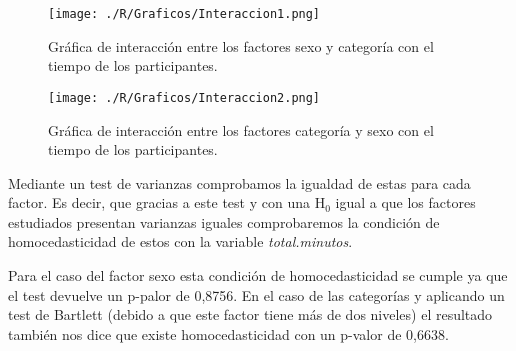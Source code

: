 \documentclass[11pt,a4paper]{article}
\begin{document}
\begin{figure}
\centering
\texttt{[image: ./R/Graficos/Interaccion1.png]}
\caption{Gráfica de interacción entre los factores sexo y categoría con el tiempo de los participantes.}
\label{fig:interaccion1}
\end{figure}

\begin{figure}
\centering
\texttt{[image: ./R/Graficos/Interaccion2.png]}
\caption{Gráfica de interacción entre los factores categoría y sexo con el tiempo de los participantes.}
\label{fig:interaccion2}
\end{figure}

Mediante un test de varianzas comprobamos la igualdad de estas para cada factor. Es decir, que gracias a este test y con una H$_{0}$ igual a que los factores estudiados presentan varianzas iguales comprobaremos la condición de homocedasticidad de estos con la variable \textit{total.minutos}.

Para el caso del factor sexo esta condición de homocedasticidad se cumple ya que el test devuelve un p-palor de 0,8756. En el caso de las categorías y aplicando un test de Bartlett (debido a que este factor tiene más de dos niveles) el resultado también nos dice que existe homocedasticidad con un p-valor de 0,6638.
\end{document}
